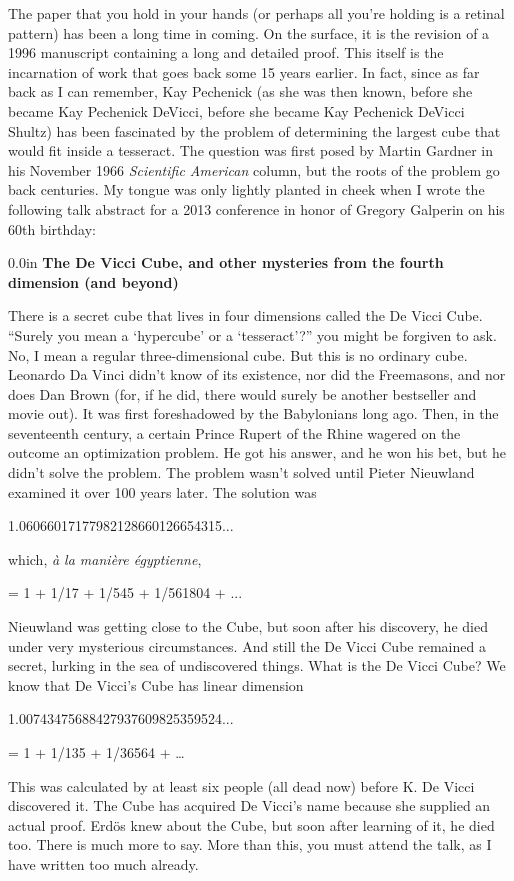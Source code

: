 The paper that you hold in your hands (or perhaps all you're holding is a
retinal pattern) has been a long time in coming. On the surface, it is the
revision of a 1996 manuscript containing a long and detailed proof. This
itself is the incarnation of work that goes back some 15 years earlier. In
fact, since as far back as I can remember, Kay Pechenick (as she was then
known, before she became Kay Pechenick DeVicci, before she became Kay
Pechenick DeVicci Shultz) has been fascinated by the problem of determining
the largest cube that would fit inside a tesseract. The question was first
posed by Martin Gardner in his November 1966 {\it Scientific American} column,
but the roots of the problem go back centuries. My tongue was only lightly
planted in cheek when I wrote the following talk abstract for a 2013
conference in honor of Gregory Galperin on his 60th birthday:

\begin{addmargin}[0.4in]{0.0in}
{\bf The De Vicci Cube, and other mysteries from the fourth dimension
(and beyond)}

There is a secret cube that lives in four dimensions called the De Vicci
Cube. ``Surely you mean a `hypercube' or a `tesseract'?'' you might be
forgiven to ask. No, I mean a regular three-dimensional cube. But this is no
ordinary cube. Leonardo Da Vinci didn't know of its existence, nor did the
Freemasons, and nor does Dan Brown (for, if he did, there would surely be
another bestseller and movie out). It was first foreshadowed by the
Babylonians long ago. Then, in the seventeenth century, a certain Prince
Rupert of the Rhine wagered on the outcome an optimization problem. He
got his answer, and he won his bet, but he didn't solve the problem. The
problem wasn't solved until Pieter Nieuwland examined it over 100 years
later. The solution was

1.06066017177982128660126654315...

which, {\it \`{a} la mani\`{e}re \'{e}gyptienne},

= 1 + 1/17 + 1/545 + 1/561804 + ...

Nieuwland was getting close to the Cube, but soon after his discovery, he
died under very mysterious circumstances. And still the De Vicci Cube
remained a secret, lurking in the sea of undiscovered things. What is the De
Vicci Cube? We know that De Vicci's Cube has linear dimension

1.00743475688427937609825359524...

= 1 + 1/135 + 1/36564 + …

This was calculated by at least six people (all dead now) before K. De Vicci
discovered it. The Cube has acquired De Vicci's name because she
supplied an actual proof. Erdös knew about the Cube, but soon after
learning of it, he died too. There is much more to say. More than this, you
must attend the talk, as I have written too much already.
\end{addmargin}

